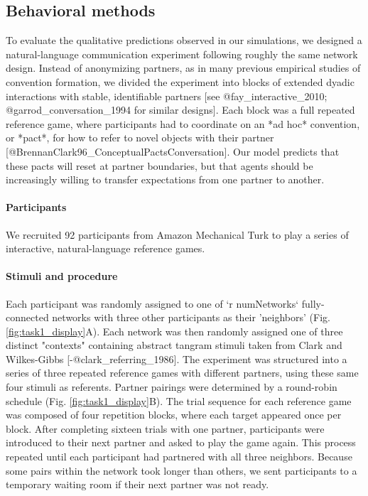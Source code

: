 \documentclass[11pt, floatsintext]{apa6}
\begin{document}
\subsection{Behavioral methods}

To evaluate the qualitative predictions observed in our simulations, we designed a natural-language communication experiment following roughly the same network design.
Instead of anonymizing partners, as in many previous empirical studies of convention formation, we divided the experiment into blocks of extended dyadic interactions with stable, identifiable partners [see @fay_interactive_2010; @garrod_conversation_1994 for similar designs].
Each block was a full repeated reference game, where participants had to coordinate on an *ad hoc* convention, or *pact*, for how to refer to novel objects with their partner [@BrennanClark96_ConceptualPactsConversation].
Our model predicts that these pacts will reset at partner boundaries, but that agents should be increasingly willing to transfer expectations from one partner to another.

\paragraph{Participants}

We recruited 92 participants from Amazon Mechanical Turk to play a series of interactive, natural-language reference games.

\paragraph{Stimuli and procedure}

Each participant was randomly assigned to one of `r numNetworks` fully-connected networks with three other participants as their 'neighbors' (Fig. \ref{fig:task1_display}A). 
Each network was then randomly assigned one of three distinct "contexts" containing abstract tangram stimuli taken from Clark and Wilkes-Gibbs [-@clark_referring_1986].
The experiment was structured into a series of three repeated reference games with different partners, using these same four stimuli as referents.
Partner pairings were determined by a round-robin schedule (Fig. \ref{fig:task1_display}B).
The trial sequence for each reference game was composed of four repetition blocks, where each target appeared once per block.
After completing sixteen trials with one partner, participants were introduced to their next partner and asked to play the game again. 
This process repeated until each participant had partnered with all three neighbors.
Because some pairs within the network took longer than others, we sent participants to a temporary waiting room if their next partner was not ready. 
\end{document}
